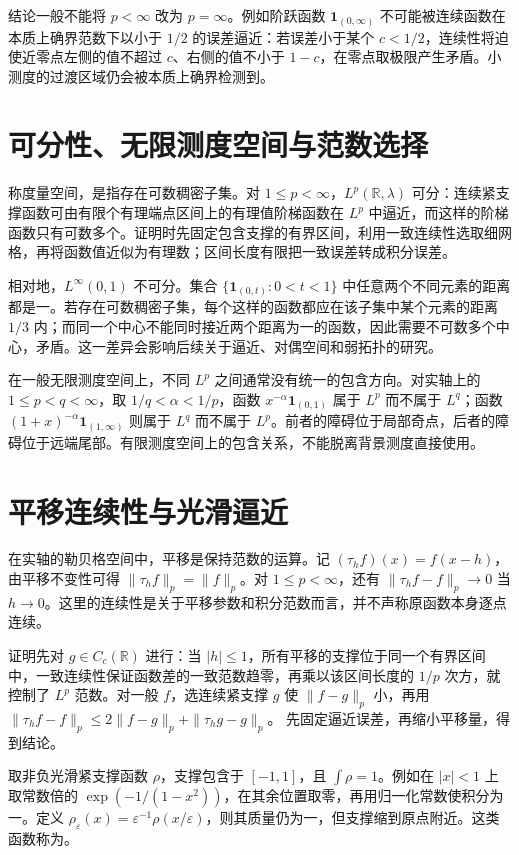 \documentclass[UTF8,12pt,a4paper,fontset=fandol]{ctexbook}
\begin{document}
结论一般不能将 $p<\infty$ 改为 $p=\infty$。例如阶跃函数 $\mathbf1_{(0,\infty)}$ 不可能被连续函数在本质上确界范数下以小于 $1/2$ 的误差逼近：若误差小于某个 $c<1/2$，连续性将迫使近零点左侧的值不超过 $c$、右侧的值不小于 $1-c$，在零点取极限产生矛盾。小测度的过渡区域仍会被本质上确界检测到。

\section{可分性、无限测度空间与范数选择}
称度量空间，是指存在可数稠密子集。对 $1\leq p<\infty$，$L^p(\mathbb R,\lambda)$ 可分：连续紧支撑函数可由有限个有理端点区间上的有理值阶梯函数在 $L^p$ 中逼近，而这样的阶梯函数只有可数多个。证明时先固定包含支撑的有界区间，利用一致连续性选取细网格，再将函数值近似为有理数；区间长度有限把一致误差转成积分误差。

相对地，$L^\infty(0,1)$ 不可分。集合 $\{\mathbf1_{(0,t)}:0<t<1\}$ 中任意两个不同元素的距离都是一。若存在可数稠密子集，每个这样的函数都应在该子集中某个元素的距离 $1/3$ 内；而同一个中心不能同时接近两个距离为一的函数，因此需要不可数多个中心，矛盾。这一差异会影响后续关于逼近、对偶空间和弱拓扑的研究。

在一般无限测度空间上，不同 $L^p$ 之间通常没有统一的包含方向。对实轴上的 $1\leq p<q<\infty$，取 $1/q<\alpha<1/p$，函数 $x^{-\alpha}\mathbf1_{(0,1)}$ 属于 $L^p$ 而不属于 $L^q$；函数 $(1+x)^{-\alpha}\mathbf1_{(1,\infty)}$ 则属于 $L^q$ 而不属于 $L^p$。前者的障碍位于局部奇点，后者的障碍位于远端尾部。有限测度空间上的包含关系，不能脱离背景测度直接使用。

\section{平移连续性与光滑逼近}
在实轴的勒贝格空间中，平移是保持范数的运算。记 $(\tau_hf)(x)=f(x-h)$，由平移不变性可得 $\|\tau_hf\|_p=\|f\|_p$。对 $1\leq p<\infty$，还有
$\|\tau_hf-f\|_p\to0$ 当 $h\to0$。这里的连续性是关于平移参数和积分范数而言，并不声称原函数本身逐点连续。

证明先对 $g\in C_c(\mathbb R)$ 进行：当 $|h|\leq1$，所有平移的支撑位于同一个有界区间中，一致连续性保证函数差的一致范数趋零，再乘以该区间长度的 $1/p$ 次方，就控制了 $L^p$ 范数。对一般 $f$，选连续紧支撑 $g$ 使 $\|f-g\|_p$ 小，再用
$\|\tau_hf-f\|_p\leq2\|f-g\|_p+\|\tau_hg-g\|_p$。
先固定逼近误差，再缩小平移量，得到结论。

取非负光滑紧支撑函数 $\rho$，支撑包含于 $[-1,1]$，且 $\int\rho=1$。例如在 $|x|<1$ 上取常数倍的 $\exp(-1/(1-x^2))$，在其余位置取零，再用归一化常数使积分为一。定义 $\rho_\varepsilon(x)=\varepsilon^{-1}\rho(x/\varepsilon)$，则其质量仍为一，但支撑缩到原点附近。这类函数称为。
\end{document}
